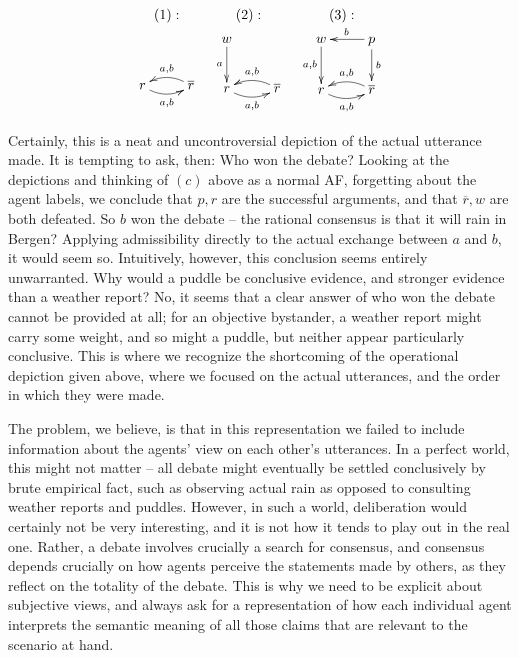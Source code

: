 \documentclass[greybox]{svmult}
\renewcommand{\bar}[1]{\overline{#1}}
\begin{document}
$$
\begin{array}{ccc}
(1): & (2): & (3): \\
\xymatrix{ \\ r\ar@/_/[r]_{a,b} & \bar{r}\ar@/_/[l]_{a,b} } &
\xymatrix{
        w\ar[d]_{a} & \\
        r\ar@/_/[r]_{a,b} & \bar{r}\ar@/_/[l]_{a,b} } &
\xymatrix{
        w\ar[d]_{a,b} & p \ar[l]_{b} \ar[d]^{b} \\
        r\ar@/_/[r]_{{a},{b}} & \bar{r}\ar@/_/[l]_{{a},{b}} }
\end{array}
$$

Certainly, this is a neat and uncontroversial depiction of the actual utterance made. It is tempting to ask, then: Who won the debate? Looking at the depictions and thinking of $(c)$ above as a normal AF, forgetting about the agent labels, we conclude that $p, r$ are the successful arguments, and that $\bar r, w$ are both defeated. So ${b}$ won the debate -- the rational consensus is that it will rain in Bergen? Applying admissibility directly to the actual exchange between $a$ and $b$, it would seem so. Intuitively, however, this conclusion seems entirely unwarranted. Why would a puddle be conclusive evidence, and stronger evidence than a weather report? No, it seems that a clear answer of who won the debate cannot be provided at all; for an objective bystander, a weather report might carry some weight, and so might a puddle, but neither appear  particularly conclusive. This is where we recognize the shortcoming of the operational depiction given above, where we focused on the actual utterances, and the order in which they were made.

The problem, we believe, is that in this representation we failed to include information about the agents' view on each other's utterances. In a perfect world, this might not matter -- all debate might eventually be settled conclusively by brute empirical fact, such as observing actual rain as opposed to consulting weather reports and puddles. However, in such a world, deliberation would certainly not be very interesting, and it is not how it tends to play out in the real one. Rather, a debate involves crucially a search for consensus, and consensus depends crucially on how agents perceive the statements made by others, as they reflect on the totality of the debate. This is why we need to be explicit about subjective views, and always ask for a representation of how each individual agent interprets the semantic meaning of all those claims that are relevant to the scenario at hand.
\end{document}

